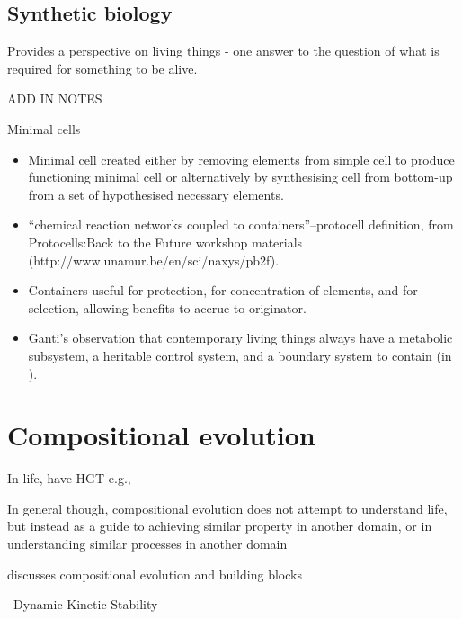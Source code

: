 \subsection{Synthetic biology}\label{synthetic-biology}

Provides a perspective on living things - one answer to the question of what is required for something to be alive.

ADD IN NOTES

Minimal cells

\begin{itemize}
	\item
	      Minimal cell created either by removing elements from simple cell to
	      produce functioning minimal cell or alternatively by synthesising cell
	      from bottom-up from a set of hypothesised necessary elements.
	\item
	      ``chemical reaction networks coupled to containers''--protocell
	      definition, from Protocells:Back to the Future workshop materials
	      (http://www.unamur.be/en/sci/naxys/pb2f).
	\item
	      Containers useful for protection, for concentration of elements, and
	      for selection, allowing benefits to accrue to originator.
	\item
	      Ganti's observation that contemporary living things always have a
	      metabolic subsystem, a heritable control system, and a boundary system
	      to contain (in \autocite{Szathmary:2006ty}).
\end{itemize}

\section{Compositional evolution}


In life, have HGT e.g., \autocite{Ochman2000}

In general though, compositional evolution does not attempt to understand life, but instead as a guide to achieving similar property in another domain, or in understanding similar processes in another domain \autocite{Arthur2009}

\autocite{Watson2002} discusses compositional evolution and building blocks

\autocite{Pross2011}--Dynamic Kinetic Stability

